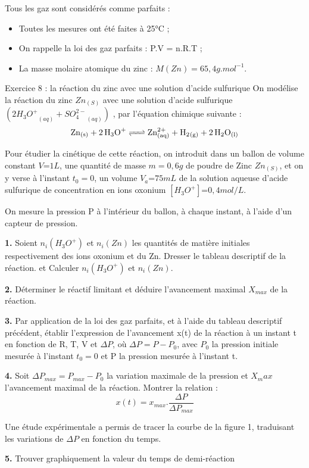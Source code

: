 \documentclass[12pt, french]{article}
\begin{document}
Tous les gaz sont considérés comme parfaits : 
\begin{itemize}
\item Toutes les mesures ont été faites à 25°C ;
\item  On rappelle la loi des gaz parfaits : P.V = n.R.T ;
\item  La masse molaire atomique du zinc : $M(Zn) = 65,4 g.mol^{-1}$.
\end{itemize}
\begin{Box2}{Exercice 8 :  la réaction du zinc avec une solution d’acide sulfurique}
	On modélise la réaction du zinc $Zn_{(S)}$ avec une solution d’acide sulfurique $({2H_3O^+}_{(aq)} +{SO_4^{2-}}_{(aq)})$ , par
l’équation chimique suivante :
$$\ce{Zn_{(s)} + 2H_3O^+  <=> Zn^{2+}_{(aq)} + {H_2}_{(g)} + 2H_2O_{(l)}}$$

Pour étudier la cinétique de cette réaction, on introduit dans un ballon de volume constant $V$=$1 L$, une
quantité de masse $m = 0,6 g$ de poudre de Zinc $Zn_{(S)}$, et on y verse à l’instant $t_0 = 0$, un volume $V_a$=$75 mL$ de la solution aqueuse d’acide sulfurique de concentration en ions oxonium $[H_3O^+]$=$0,4 mol/L$.

On mesure la pression P à l’intérieur du ballon, à chaque instant, à l’aide d’un capteur de pression.

\textbf{1. } Soient $n_i(H_3O^+)$ et $n_i(Zn)$ les quantités de matière initiales respectivement des ions oxonium et du
Zn. Dresser le tableau descriptif de la réaction. et Calculer $n_i(H_3O^+)$ et $n_i(Zn)$.

\textbf{2. }Déterminer le réactif limitant et déduire l’avancement maximal  $X_{max}$ de la réaction.

\textbf{3. } Par application de la loi des gaz parfaits, et à l’aide du tableau descriptif précédent, établir
l’expression de l’avancement x(t) de la réaction à un instant t en fonction de R, T, V et $\Delta{P}$, où
$\Delta{P} = P - P_0$, avec $P_0$ la pression initiale mesurée à l’instant  $t_0 = 0$ et P la pression mesurée à l’instant t.

\textbf{4. }Soit $\Delta{P_{max}}= P_{max}  - P_0$ la variation
maximale de la pression et $X_max$
l’avancement maximal de la
réaction. Montrer la relation :
$$x(t) = x_{max}.\frac{\Delta{P}}{\Delta{P_{max}}}$$

Une étude expérimentale a permis
de tracer la courbe de la figure 1,
traduisant les variations de $\Delta{P}$ en
fonction du temps.

\textbf{5. } Trouver graphiquement la valeur du
temps de demi-réaction


\end{Box2}
\end{document}
